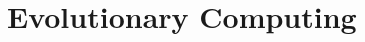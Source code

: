 \documentclass{report}
\begin{document}





\section{Evolutionary Computing}
\label{sec:ec}
\end{document}
